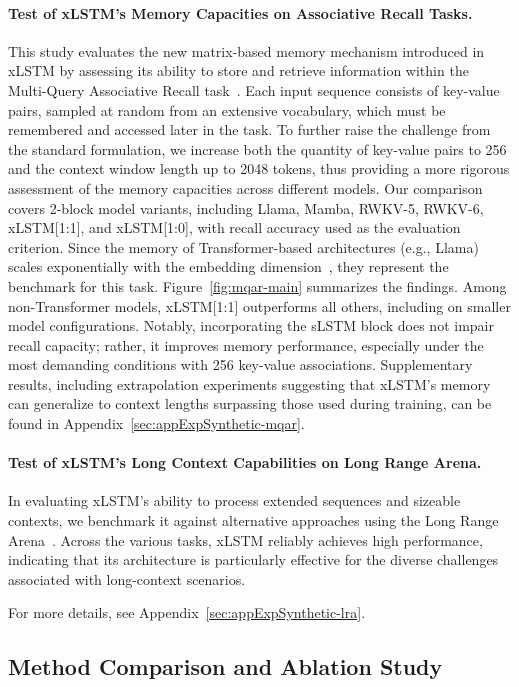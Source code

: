 \paragraph{Test of xLSTM's Memory Capacities on Associative Recall Tasks.} This study evaluates the new matrix-based memory mechanism introduced in xLSTM by assessing its ability to store and retrieve information within the Multi-Query Associative Recall task~\citep{Arora:23arxiv}. Each input sequence consists of key-value pairs, sampled at random from an extensive vocabulary, which must be remembered and accessed later in the task. To further raise the challenge from the standard formulation, we increase both the quantity of key-value pairs to 256 and the context window length up to 2048 tokens, thus providing a more rigorous assessment of the memory capacities across different models. Our comparison covers 2-block model variants, including Llama, Mamba, RWKV-5, RWKV-6, xLSTM[1:1], and xLSTM[1:0], with recall accuracy used as the evaluation criterion. Since the memory of Transformer-based architectures (e.g., Llama) scales exponentially with the embedding dimension~\citep{Ramsauer:21}, they represent the benchmark for this task. Figure~\ref{fig:mqar-main} summarizes the findings. Among non-Transformer models, xLSTM[1:1] outperforms all others, including on smaller model configurations. Notably, incorporating the sLSTM block does not impair recall capacity; rather, it improves memory performance, especially under the most demanding conditions with 256 key-value associations. Supplementary results, including extrapolation experiments suggesting that xLSTM's memory can generalize to context lengths surpassing those used during training, can be found in Appendix~\ref{sec:appExpSynthetic-mqar}.

\paragraph{Test of xLSTM's Long Context Capabilities on Long Range Arena.} In evaluating xLSTM's ability to process extended sequences and sizeable contexts, we benchmark it against alternative approaches using the Long Range Arena~\citep{Tay:21}. Across the various tasks, xLSTM reliably achieves high performance, indicating that its architecture is particularly effective for the diverse challenges associated with long-context scenarios.

For more details, see Appendix~\ref{sec:appExpSynthetic-lra}.

\subsection{Method Comparison and Ablation Study}
\label{sec:ExpComparison}

